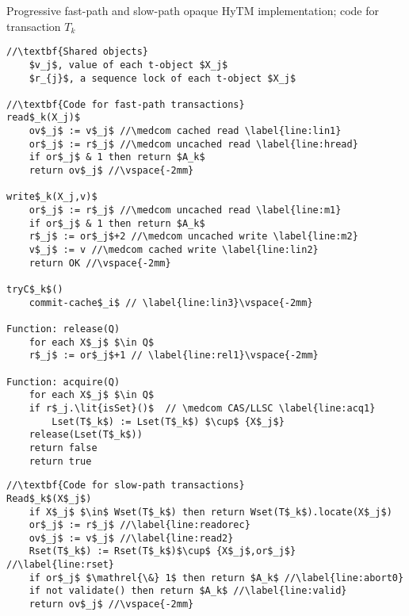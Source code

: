\begin{algorithm*}[!ht]
\caption{Progressive fast-path and slow-path opaque HyTM implementation; code for transaction $T_k$}
\label{alg:inswrite}
\vspace{-2mm}
\noindent\lstset{style=customc}
\begin{minipage}{0.49\textwidth}
\begin{lstlisting}[frame=none,firstnumber=1,mathescape=true]
//\textbf{Shared objects}
    $v_j$, value of each t-object $X_j$ 
    $r_{j}$, a sequence lock of each t-object $X_j$

//\textbf{Code for fast-path transactions}
read$_k(X_j)$
    ov$_j$ := v$_j$ //\medcom cached read \label{line:lin1}
    or$_j$ := r$_j$ //\medcom uncached read \label{line:hread}
    if or$_j$ & 1 then return $A_k$ 
    return ov$_j$ //\vspace{-2mm}

write$_k(X_j,v)$
    or$_j$ := r$_j$ //\medcom uncached read \label{line:m1}
    if or$_j$ & 1 then return $A_k$
    r$_j$ := or$_j$+2 //\medcom uncached write \label{line:m2}
    v$_j$ := v //\medcom cached write \label{line:lin2} 
    return OK //\vspace{-2mm}

tryC$_k$()
    commit-cache$_i$ // \label{line:lin3}\vspace{-2mm}

Function: release(Q)
    for each X$_j$ $\in Q$
	r$_j$ := or$_j$+1 // \label{line:rel1}\vspace{-2mm}
	
Function: acquire(Q)
    for each X$_j$ $\in Q$	
	if r$_j.\lit{isSet}()$  // \medcom CAS/LLSC \label{line:acq1}
	    Lset(T$_k$) := Lset(T$_k$) $\cup$ {X$_j$}
	release(Lset(T$_k$))
	return false
    return true
\end{lstlisting}
\end{minipage}
\begin{minipage}{0.49\textwidth}
\begin{lstlisting}[frame=none,firstnumber=last,mathescape=true]
//\textbf{Code for slow-path transactions}
Read$_k$(X$_j$)
    if X$_j$ $\in$ Wset(T$_k$) then	return Wset(T$_k$).locate(X$_j$) 
    or$_j$ := r$_j$ //\label{line:readorec}
    ov$_j$ := v$_j$ //\label{line:read2}
    Rset(T$_k$) := Rset(T$_k$)$\cup$ {X$_j$,or$_j$} //\label{line:rset}
    if or$_j$ $\mathrel{\&} 1$ then return $A_k$ //\label{line:abort0}	
    if not validate() then return $A_k$ //\label{line:valid}
    return ov$_j$ //\vspace{-2mm}


\end{lstlisting}
\end{minipage}
\end{algorithm*}
